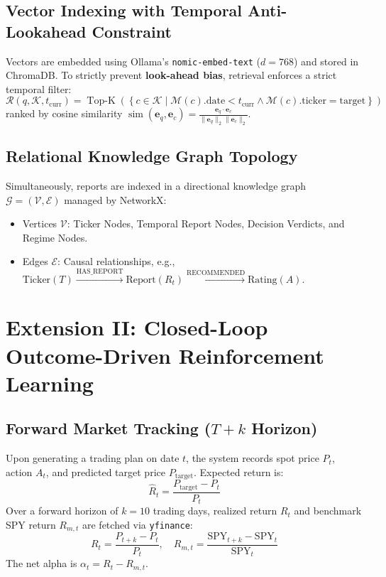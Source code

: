 \documentclass[conference]{IEEEtran}
\begin{document}
\subsection{Vector Indexing with Temporal Anti-Lookahead Constraint}
Vectors are embedded using Ollama's \texttt{nomic-embed-text} ($d = 768$) and stored in ChromaDB. To strictly prevent \textbf{look-ahead bias}, retrieval enforces a strict temporal filter:
\begin{equation}
\mathcal{R}(q, \mathcal{K}, t_{\text{curr}}) = \operatorname{Top-K} \left( \left\{ c \in \mathcal{K} \mid \mathcal{M}(c).\text{date} < t_{\text{curr}} \land \mathcal{M}(c).\text{ticker} = \text{target} \right\} \right)
\end{equation}
ranked by cosine similarity $\operatorname{sim}(\mathbf{e}_q, \mathbf{e}_c) = \frac{\mathbf{e}_q \cdot \mathbf{e}_c}{\|\mathbf{e}_q\|_2 \|\mathbf{e}_c\|_2}$.

\subsection{Relational Knowledge Graph Topology}
Simultaneously, reports are indexed in a directional knowledge graph $\mathcal{G} = (\mathcal{V}, \mathcal{E})$ managed by NetworkX:
\begin{itemize}
    \item Vertices $\mathcal{V}$: Ticker Nodes, Temporal Report Nodes, Decision Verdicts, and Regime Nodes.
    \item Edges $\mathcal{E}$: Causal relationships, e.g., $\text{Ticker}(T) \xrightarrow{\text{HAS\_REPORT}} \text{Report}(R_t) \xrightarrow{\text{RECOMMENDED}} \text{Rating}(A)$.
\end{itemize}

\section{Extension II: Closed-Loop Outcome-Driven Reinforcement Learning}

\subsection{Forward Market Tracking ($T+k$ Horizon)}
Upon generating a trading plan on date $t$, the system records spot price $P_t$, action $A_t$, and predicted target price $P_{\text{target}}$. Expected return is:
\begin{equation}
\hat{R}_t = \frac{P_{\text{target}} - P_t}{P_t}
\end{equation}
Over a forward horizon of $k=10$ trading days, realized return $R_t$ and benchmark SPY return $R_{m,t}$ are fetched via \texttt{yfinance}:
\begin{equation}
R_t = \frac{P_{t+k} - P_t}{P_t}, \quad R_{m,t} = \frac{\text{SPY}_{t+k} - \text{SPY}_t}{\text{SPY}_t}
\end{equation}
The net alpha is $\alpha_t = R_t - R_{m,t}$.
\end{document}

